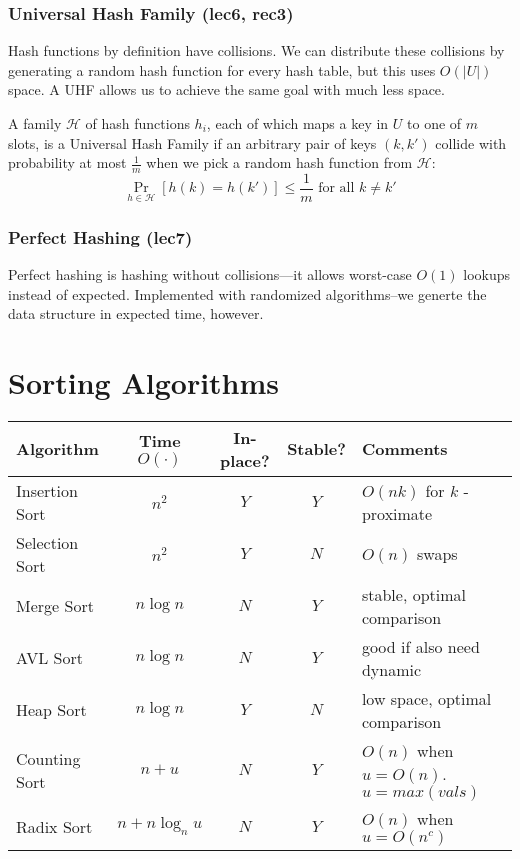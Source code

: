 \documentclass{article}
\DeclareMathOperator*{\prob}{\text{Pr}}
\begin{document}
\begin{multicols}{2}
\subsubsection{Universal Hash Family (lec6, rec3)}
Hash functions by definition have collisions. We can distribute these collisions by generating a random hash function for every hash table, but this uses $O(|U|)$ space. A UHF allows us to achieve the same goal with much less space. 

A family $\mathcal{H}$ of hash functions $h_i$, each of which maps a key in $U$ to one of $m$ slots, is a Universal Hash Family if an arbitrary pair of keys $(k, k')$ collide with probability at most $\frac{1}{m}$ when we pick a random hash function from $\mathcal{H}$:  
\[ \prob_{h \in \mathcal{H}}{[h(k) = h(k')]} \leq \frac{1}{m} \text{ for all } k\neq k' \]

\subsubsection{Perfect Hashing (lec7)}
Perfect hashing is hashing without collisions---it allows worst-case $O(1)$ lookups instead of expected. Implemented with randomized algorithms--we generte the data structure in expected time, however. 

\end{multicols}






\newpage %
\section{Sorting Algorithms}

\begin{center}
    \begin{tabular}{l||c|c|c|l||} 
        Algorithm & Time $O(\cdot)$ & In-place? & Stable? & Comments \\
        \hline \hline Insertion Sort & $n^{2}$ & $Y$ & $Y$ & $O(n k)$ for $k$ -proximate \\
        \hline Selection Sort & $n^{2}$ & $Y$ & $N$ & $O(n)$ swaps \\
        \hline Merge Sort & $n \log n$ & $N$ & $Y$ & stable, optimal comparison \\
        \hline AVL Sort & $n \log n$ & $N$ & $Y$ & good if also need dynamic \\
        \hline Heap Sort & $n \log n$ & $Y$ & $N$ & low space, optimal comparison \\
        \hline Counting Sort & $n+u$ & $N$ & $Y$ & $O(n)$ when $u=O(n)$. $u=max(vals)$ \\
        \hline Radix Sort & $n+n \log _{n} u$ & $N$ & $Y$ & $O(n)$ when $u=O\left(n^{c}\right)$ \\
        \hline
    \end{tabular}
\end{center}
\end{document}
